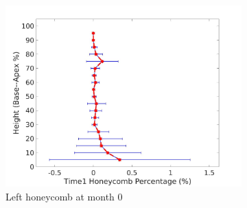\begin{figure}[H]
\begin{subfigure}{.42\linewidth}
  \includegraphics[width=\linewidth,trim={{.0\wd0} {.0\wd0} {.0\wd0} {.0\wd0}},clip]{QuantitativeAnalysis/Image/LeftLungHoneycombDiseaseAgainstHeightTime1.jpg} %
  \caption{Left honeycomb at month 0}
  \label{fig:DiseaseAgainstHeightTime1-e} 
\end{subfigure} 
\begin{subfigure}{.42\linewidth}%

\end{subfigure}
\end{figure}
